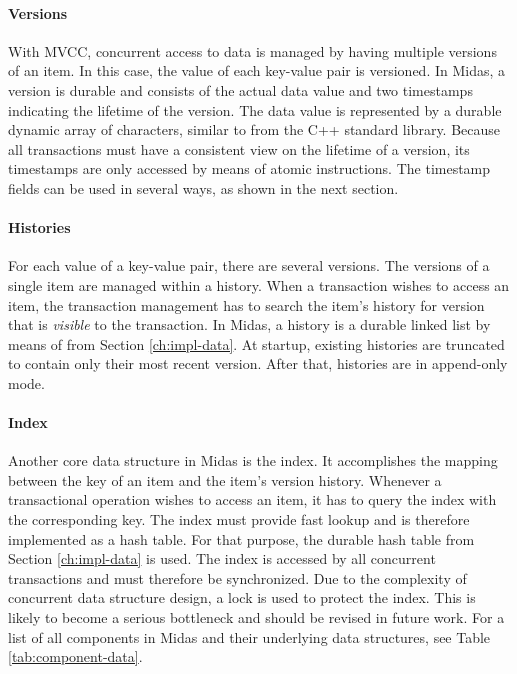 \paragraph{Versions}

With MVCC, concurrent access to data is managed by having multiple versions of an item. In this case, the value of each key-value pair is versioned. In Midas, a version is durable and consists of the actual data value and two timestamps indicating the lifetime of the version. The data value is represented by a durable dynamic array of characters, similar to  from the C++ standard library. Because all transactions must have a consistent view on the lifetime of a version, its timestamps are only accessed by means of atomic instructions. The timestamp fields can be used in several ways, as shown in the next section.

\paragraph{Histories}

For each value of a key-value pair, there are several versions. The versions of a single item are managed within a history. When a transaction wishes to access an item, the transaction management has to search the item's history for version that is \emph{visible} to the transaction. In Midas, a history is a durable linked list by means of  from Section \ref{ch:impl-data}. At startup, existing histories are truncated to contain only their most recent version. After that, histories are in append-only mode.

\paragraph{Index}

Another core data structure in Midas is the index. It accomplishes the mapping between the key of an item and the item's version history. Whenever a transactional operation wishes to access an item, it has to query the index with the corresponding key. The index must provide fast lookup and is therefore implemented as a hash table. For that purpose, the durable hash table  from Section \ref{ch:impl-data} is used. The index is accessed by all concurrent transactions and must therefore be synchronized. Due to the complexity of concurrent data structure design, a lock is used to protect the index. This is likely to become a serious bottleneck and should be revised in future work. For a list of all components in Midas and their underlying data structures, see Table \ref{tab:component-data}.

